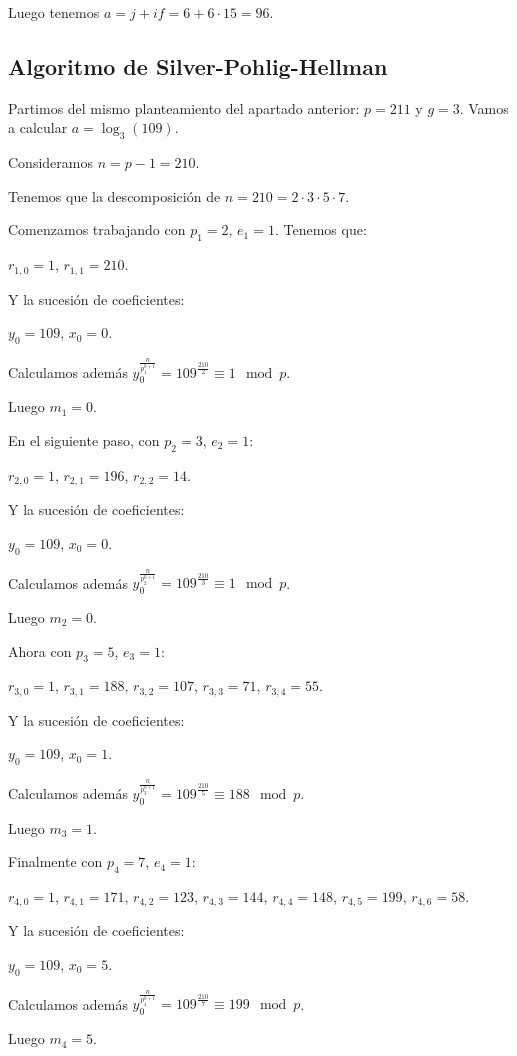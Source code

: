 \documentclass[a4paper]{article}
\begin{document}
Luego tenemos $a=j+if=6+6\cdot 15=96$.

\subsection{Algoritmo de Silver-Pohlig-Hellman}

Partimos del mismo planteamiento del apartado anterior: $p=211$ y $g=3$. Vamos a calcular $a=\log_3 (109)$.

Consideramos $n=p-1=210$.

Tenemos que la descomposición de $n=210=2 \cdot 3 \cdot 5\cdot 7$.

Comenzamos trabajando con $p_1=2$, $e_1=1$. Tenemos que:

$r_{1,0}=1$, $r_{1,1}=210$.

Y la sucesión de coeficientes:

$y_0 = 109$, $x_0 = 0$.

Calculamos además $y_0^{\frac{n}{p_1^{0+1}}}=109^{\frac{210}{2}}\equiv 1\mod p$.

Luego $m_1=0$.

En el siguiente paso, con $p_2=3$, $e_2=1$:

$r_{2,0}=1$, $r_{2,1}=196$, $r_{2,2}=14$.

Y la sucesión de coeficientes:

$y_0 = 109$, $x_0 = 0$.

Calculamos además $y_0^{\frac{n}{p_2^{0+1}}}=109^{\frac{210}{3}}\equiv 1\mod p$.


Luego $m_2=0$.

Ahora con $p_3=5$, $e_3=1$:

$r_{3,0}=1$, $r_{3,1}=188$, $r_{3,2}=107$, $r_{3,3}=71$, $r_{3,4}=55$.

Y la sucesión de coeficientes:

$y_0 = 109$, $x_0 = 1$.

Calculamos además $y_0^{\frac{n}{p_3^{0+1}}}=109^{\frac{210}{5}}\equiv 188\mod p$.


Luego $m_3=1$.

Finalmente con $p_4=7$, $e_4=1$:

$r_{4,0}=1$, $r_{4,1}=171$, $r_{4,2}=123$, $r_{4,3}=144$, $r_{4,4}=148$, $r_{4,5}=199$, $r_{4,6}=58$.

Y la sucesión de coeficientes:

$y_0 = 109$, $x_0 = 5$.

Calculamos además $y_0^{\frac{n}{p_4^{0+1}}}=109^{\frac{210}{7}}\equiv 199\mod p$.


Luego $m_4=5$.
\end{document}
